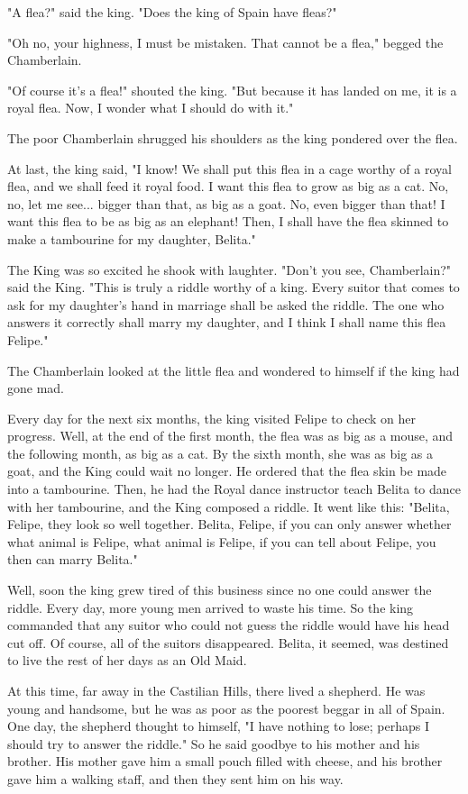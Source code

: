 "A flea?" said the king. "Does the king of Spain have fleas?"

"Oh no, your highness, I must be mistaken. That cannot be a flea," begged the Chamberlain.

"Of course it's a flea!" shouted the king. "But because it has landed on me, it is a royal flea. Now, I wonder what I should do with it."

The poor Chamberlain shrugged his shoulders as the king pondered over the flea.

At last, the king said, "I know! We shall put this flea in a cage worthy of a royal flea, and we shall feed it royal food. I want this flea to grow as big as a cat. No, no, let me see... bigger than that, as big as a goat. No, even bigger than that! I want this flea to be as big as an elephant! Then, I shall have the flea skinned to make a tambourine for my daughter, Belita."

The King was so excited he shook with laughter. "Don't you see, Chamberlain?" said the King. "This is truly a riddle worthy of a king. Every suitor that comes to ask for my daughter's hand in marriage shall be asked the riddle. The one who answers it correctly shall marry my daughter, and I think I shall name this flea Felipe."

The Chamberlain looked at the little flea and wondered to himself if the king had gone mad.

Every day for the next six months, the king visited Felipe to check on her progress. Well, at the end of the first month, the flea was as big as a mouse, and the following month, as big as a cat. By the sixth month, she was as big as a goat, and the King could wait no longer. He ordered that the flea skin be made into a tambourine. Then, he had the Royal dance instructor teach Belita to dance with her tambourine, and the King composed a riddle. It went like this: "Belita, Felipe, they look so well together. Belita, Felipe, if you can only answer whether what animal is Felipe, what animal is Felipe, if you can tell about Felipe, you then can marry Belita."

Well, soon the king grew tired of this business since no one could answer the riddle. Every day, more young men arrived to waste his time. So the king commanded that any suitor who could not guess the riddle would have his head cut off. Of course, all of the suitors disappeared. Belita, it seemed, was destined to live the rest of her days as an Old Maid.

At this time, far away in the Castilian Hills, there lived a shepherd. He was young and handsome, but he was as poor as the poorest beggar in all of Spain. One day, the shepherd thought to himself, "I have nothing to lose; perhaps I should try to answer the riddle." So he said goodbye to his mother and his brother. His mother gave him a small pouch filled with cheese, and his brother gave him a walking staff, and then they sent him on his way.

